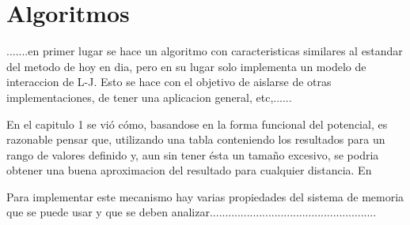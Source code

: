 \documentclass[a4paper,10pt]{report}
\begin{document}
\chapter{Algoritmos}
 
 









.......en primer lugar se hace un algoritmo con caracteristicas similares al estandar del metodo de hoy en dia, pero en su lugar solo implementa un modelo de interaccion de L-J. 
Esto se hace con el objetivo de aislarse de otras implementaciones, de tener una aplicacion general, etc,......





En el capitulo 1 se vió cómo, basandose en la forma funcional del potencial, es razonable pensar que, utilizando una tabla conteniendo los resultados para un rango de valores definido y, aun sin tener ésta un tamaño excesivo, se podria obtener una buena aproximacion del resultado para cualquier distancia. 
En 




Para implementar este mecanismo hay varias propiedades del sistema de memoria que se puede usar y que se deben analizar......................................................
\end{document}
